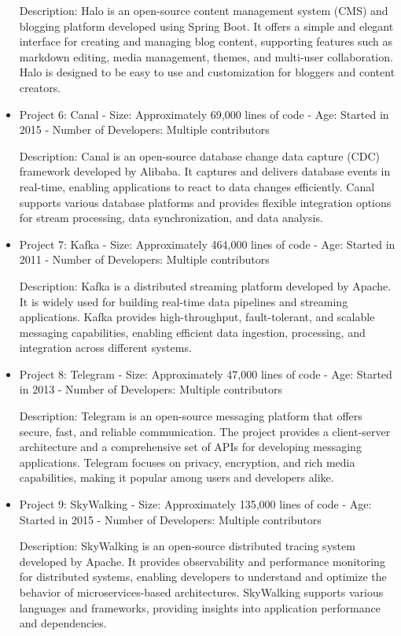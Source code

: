 \documentclass[conference]{IEEEtran}
\begin{document}
\begin{itemize}
		Description: Halo is an open-source content management system (CMS) and blogging platform developed using Spring Boot. It offers a simple and elegant interface for creating and managing blog content, supporting features such as markdown editing, media management, themes, and multi-user collaboration. Halo is designed to be easy to use and customization for bloggers and content creators.
		
		\item Project 6: Canal
		- Size: Approximately 69,000 lines of code
		- Age: Started in 2015
		- Number of Developers: Multiple contributors
		
		Description: Canal is an open-source database change data capture (CDC) framework developed by Alibaba. It captures and delivers database events in real-time, enabling applications to react to data changes efficiently. Canal supports various database platforms and provides flexible integration options for stream processing, data synchronization, and data analysis.
		
		\item Project 7: Kafka
		- Size: Approximately 464,000 lines of code
		- Age: Started in 2011
		- Number of Developers: Multiple contributors
		
		Description: Kafka is a distributed streaming platform developed by Apache. It is widely used for building real-time data pipelines and streaming applications. Kafka provides high-throughput, fault-tolerant, and scalable messaging capabilities, enabling efficient data ingestion, processing, and integration across different systems.
		
		\item Project 8: Telegram
		- Size: Approximately 47,000 lines of code
		- Age: Started in 2013
		- Number of Developers: Multiple contributors
		
		Description: Telegram is an open-source messaging platform that offers secure, fast, and reliable communication. The project provides a client-server architecture and a comprehensive set of APIs for developing messaging applications. Telegram focuses on privacy, encryption, and rich media capabilities, making it popular among users and developers alike.
		
		\item Project 9: SkyWalking
		- Size: Approximately 135,000 lines of code
		- Age: Started in 2015
		- Number of Developers: Multiple contributors
		
		Description: SkyWalking is an open-source distributed tracing system developed by Apache. It provides observability and performance monitoring for distributed systems, enabling developers to understand and optimize the behavior of microservices-based architectures. SkyWalking supports various languages and frameworks, providing insights into application performance and dependencies.
		

\end{itemize}
\end{document}
